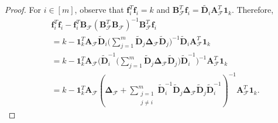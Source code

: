\documentclass[journal,draftcls,onecolumn]{IEEEtran}
\theoremstyle{mystyle}
\newcommand{\bfD}{\mathbf{D}}
\newcommand{\bfA}{\mathbf{A}}
\newcommand{\bfB}{\mathbf{B}}
\newcommand{\cF}{\mathcal{F}}
\begin{document}
\begin{proof}
For $i \in [m]$, observe that $\mathbf{f}_i^T\mathbf{f}_i = k$ and $\mathbf{B}_{\mathcal{F}}^T \mathbf{f}_i = \tilde{\mathbf{D}_i}\mathbf{A}_{\mathcal{F}}^T\mathbf{1}_k$. Therefore, 
\begin{align*}
&\mathbf{f}_i^T \mathbf{f}_i - \mathbf{f}_i^T \bfB_{\cF}(\bfB_{\cF}^T\bfB_{\cF})^{-1}\bfB_{\cF}^T\mathbf{f}_i\\
& = k - \mathbf{1}_k^T \bfA_{\cF} \tilde{\bfD}_i\Bigg(\sum_{j = 1}^m \tilde{\bfD}_j\mathbf{\Delta}_{\mathcal{F}}\tilde{\bfD}_j\Bigg)^{-1}\tilde{\bfD}_i \bfA_{\cF}^T \mathbf{1}_k\\
& = k - \mathbf{1}_k^T \bfA_{\cF} \Bigg(\tilde{\bfD}^{-1}_i\Bigg(\sum_{j = 1}^m \tilde{\bfD}_j\mathbf{\Delta}_{\mathcal{F}}\tilde{\bfD}_j\Bigg)\tilde{\bfD}^{-1}_i\Bigg)^{-1} \bfA_{\cF}^T \mathbf{1}_k\\
& = k -  \mathbf{1}_k^T \bfA_{\cF} \left( \mathbf{\Delta}_{\mathcal{F}}  + \sum_{\substack{j = 1 \\ j \neq i}}^m\tilde{\bfD}^{-1}_i\tilde{\bfD}_j\mathbf{\Delta}_{\mathcal{F}}\tilde{\bfD}_j\tilde{\bfD}^{-1}_i\right)^{-1}\bfA_{\cF}^T\mathbf{1}_k.
\end{align*}


\end{proof}
\end{document}

